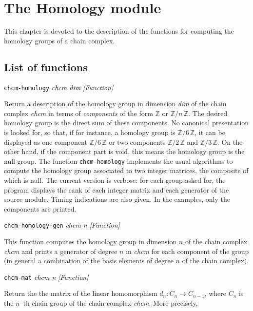 \chapter {The Homology module}

This chapter is devoted to the description of the functions for
computing the homology groups of a chain complex.

\section {List of functions}

{\parindent=0mm
{\leftskip=5mm
{\tt chcm-homology} {\em chcm dim} \hfill {\em [Function]} \par}
{\leftskip=15mm
Return a description  of the homology group in dimension {\em dim} of the chain complex {\em chcm}
in terms of {\em components} of the form $\mathbb{Z}$ or $\mathbb{Z}/{n\, \mathbb{Z}}$.
The desired homology group is the direct sum of these
components. No canonical presentation is looked for, so that, if for instance,
a homology group is $\mathbb{Z}/{6\, \mathbb{Z}}$, it can be displayed as one component
$\mathbb{Z}/{6\, \mathbb{Z}}$ or two components $\mathbb{Z}/{2\, \mathbb{Z}}$ and $\mathbb{Z}/{3\, \mathbb{Z}}$.
On the other hand, if the component part  is void, this  means  the homology
group is the null group. The function {\tt chcm-homology} implements the
usual algorithms to compute the homology group associated to two integer matrices,
the composite of which is null. The current version is verbose: for each group asked for,
the program displays the rank of each integer matrix and each generator of the source
module. Timing indications are also given. In the examples, only the  components are printed.
\par }
{\leftskip=5mm
{\tt chcm-homology-gen} {\em chcm n} \hfill {\em [Function]} \par}
{\leftskip=15mm
This function computes the homology group in dimension $n$ of the chain complex
{\em chcm} and prints a generator of degree $n$ in {\em chcm} for each component of
the group (in general a combination of the  basis elements of degree $n$ of the
chain complex).\par}
{\leftskip=5mm
{\tt chcm-mat} {\em chcm n} \hfill {\em [Function]} \par}
{\leftskip=15mm
Return the   the  matrix of the li\-ne\-ar homomorphism
$d_n: C_n \rightarrow C_{n-1}$, where
$C_n$ is the $n$--th chain group   of the chain complex  {\em chcm}. More precisely,
}}
